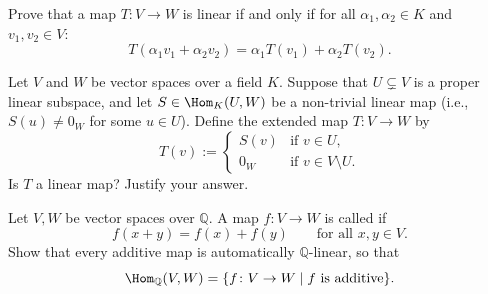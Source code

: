 \begin{exercise}
\label{exer:linearity_criterion}
Prove that a map $T: V \to W$ is linear if and only if for all $\alpha_1, \alpha_2 \in K$ and $v_1, v_2 \in V$:
\[
T(\alpha_1 v_1 + \alpha_2 v_2) = \alpha_1 T(v_1) + \alpha_2 T(v_2).
\]
\end{exercise}

\begin{exercise}
\label{exc:extending_linear_map_by_zero}
Let $V$ and $W$ be vector spaces over a field $K$. Suppose that $U \subsetneq V$ is a proper linear subspace, and let $S \in \Hom_K(U, W)$ be a non-trivial linear map (i.e., $S(u) \ne 0_W$ for some $u \in U$). Define the extended map $T \colon V \to W$ by
\[
T(v) :=
\begin{cases}
S(v) & \text{if } v \in U, \\
0_W & \text{if } v \in V \setminus U.
\end{cases}
\]
Is $T$ a linear map? Justify your answer.
\end{exercise}

\begin{exercise}
\label{exc:additive_maps_over_rationals}
Let $V, W$ be vector spaces over $\mathbb{Q}$. A map $f \colon V \to W$ is called  if
\[
f(x + y) = f(x) + f(y) \qquad \text{for all } x, y \in V.
\]
Show that every additive map is automatically $\mathbb{Q}$-linear, so that
\[
\Hom_{\mathbb{Q}}(V, W) = \{f \colon V \to W \mid f \text{ is additive}\}.
\]
\end{exercise}

